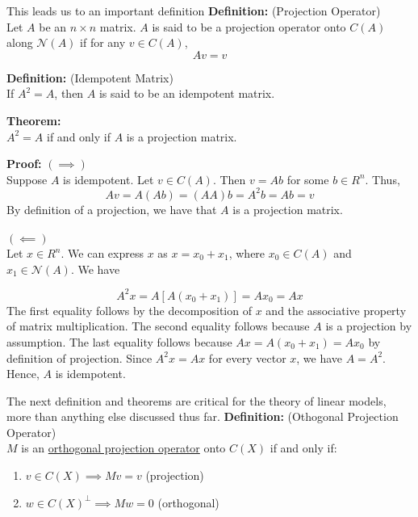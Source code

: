 \documentclass[12pt]{article}
\numberwithin{equation}{section}
\begin{document}
This leads us to an important definition
\textbf{Definition:} (Projection Operator) \\
Let $A$ be an $n \times n$ matrix. $A$ is said to be a projection operator onto $C(A)$ along $\mathcal{N}(A)$ if for any $v \in C(A)$,
\begin{equation*}
  Av = v
\end{equation*}

\textbf{Definition:} (Idempotent Matrix) \\
If $A^2 = A$, then $A$ is said to be an idempotent matrix.

\textbf{Theorem:} \\
$A^2 = A$ if and only if $A$ is a projection matrix.

\textbf{Proof:}
$(\implies)$\\
Suppose $A$ is idempotent. Let $v \in C(A)$. Then $v = Ab$ for some $b \in R^n$. Thus,
\begin{equation*}
  Av = A(Ab) = (AA)b = A^2 b = Ab = v
\end{equation*}
By definition of a projection, we have that $A$ is a projection matrix.\\
\\
$(\impliedby)$ \\
Let $x \in R^n$. We can express $x$ as $x = x_0 + x_1$, where $x_0 \in C(A)$ and $x_1 \in \mathcal{N}(A)$. We have

\begin{equation*}
  A^2 x = A[A(x_0 + x_1)] = A x_0 = Ax
\end{equation*}
The first equality follows by the decomposition of $x$ and the associative property of matrix multiplication. The second equality follows because $A$ is a projection by assumption. The last equality follows because $Ax = A(x_0 + x_1) = A x_0$ by definition of projection. Since $A^2 x = Ax$ for every vector $x$, we have $A = A^2$. Hence, $A$ is idempotent.

The next definition and theorems are critical for the theory of linear models, more than anything else discussed thus far.
\textbf{Definition:} (Othogonal Projection Operator) \\
$M$ is an \underline{orthogonal projection operator} onto $C(X)$ if and only if:
\begin{enumerate}
  \item $v \in C(X) \implies Mv = v$  (projection) 
  \item $w \in C(X)^{\perp} \implies Mw = 0$  (orthogonal)
\end{enumerate}
\end{document}
